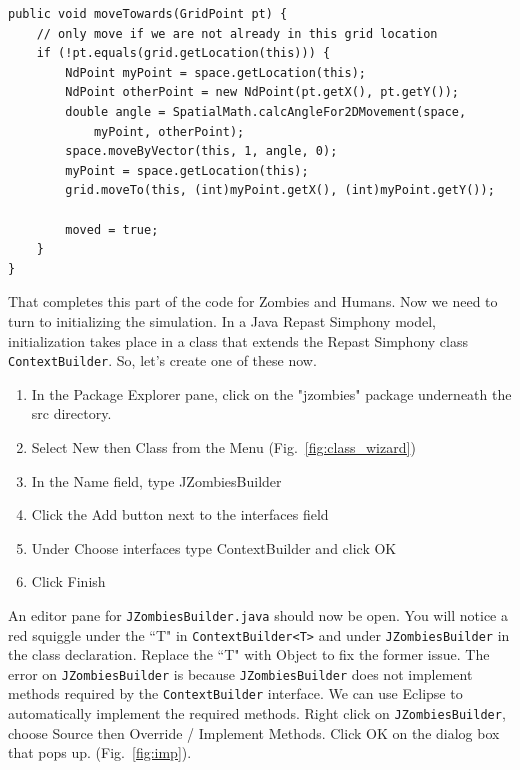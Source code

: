 \documentclass[11pt]{amsart}
\begin{document}
\noindent\begin{minipage}[h]{\textwidth}
\vspace{.2in}
\lstset{language=java,caption=Zombie MovedTowards with Moved}
\begin{lstlisting}
public void moveTowards(GridPoint pt) {
	// only move if we are not already in this grid location
	if (!pt.equals(grid.getLocation(this))) {
		NdPoint myPoint = space.getLocation(this);
		NdPoint otherPoint = new NdPoint(pt.getX(), pt.getY());
		double angle = SpatialMath.calcAngleFor2DMovement(space, 
			myPoint, otherPoint);
		space.moveByVector(this, 1, angle, 0);
		myPoint = space.getLocation(this);
		grid.moveTo(this, (int)myPoint.getX(), (int)myPoint.getY());
		
		moved = true;
	}
}
\end{lstlisting}
\vspace{.2in}
\end{minipage}

That completes this part of the code for Zombies and Humans. Now we need to turn to initializing the simulation. In a Java Repast Simphony model, initialization takes place in a class that extends the Repast Simphony class \texttt{ContextBuilder}. So, let's create one of these now.\\

\begin{enumerate}
\item In the Package Explorer pane, click on the "jzombies" package underneath the src directory. 
\item Select New then Class from the Menu (Fig.~\ref{fig:class_wizard})
\item In the Name field, type JZombiesBuilder
\item Click the Add button next to the interfaces field
\item Under Choose interfaces type ContextBuilder and click OK
\item Click Finish
\end{enumerate}

\vspace{.2in}
An editor pane for \texttt{JZombiesBuilder.java} should now be open. You will notice a red squiggle under the ``T" in \texttt{ContextBuilder<T>} and under \texttt{JZombiesBuilder} in the class declaration. Replace the ``T" with Object to fix the former issue. The error on \texttt{JZombiesBuilder} is because \texttt{JZombiesBuilder} does not implement methods required by the \texttt{ContextBuilder} interface. We can use Eclipse to automatically implement the required methods. Right click on \texttt{JZombiesBuilder}, choose Source then Override / Implement Methods. Click OK on the dialog box that pops up.  (Fig.~\ref{fig:imp}).
\end{document}
